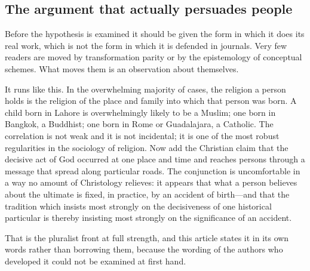 \subsection{The argument that actually persuades people}

Before the hypothesis is examined it should be given the form in which it does its real work, which is not the form in which it is defended in journals. Very few readers are moved by transformation parity or by the epistemology of conceptual schemes. What moves them is an observation about themselves.

It runs like this. In the overwhelming majority of cases, the religion a person holds is the religion of the place and family into which that person was born. A child born in Lahore is overwhelmingly likely to be a Muslim; one born in Bangkok, a Buddhist; one born in Rome or Guadalajara, a Catholic. The correlation is not weak and it is not incidental; it is one of the most robust regularities in the sociology of religion. Now add the Christian claim that the decisive act of God occurred at one place and time and reaches persons through a message that spread along particular roads. The conjunction is uncomfortable in a way no amount of Christology relieves: it appears that what a person believes about the ultimate is fixed, in practice, by an accident of birth---and that the tradition which insists most strongly on the decisiveness of one historical particular is thereby insisting most strongly on the significance of an accident.

That is the pluralist front at full strength, and this article states it in its own words rather than borrowing them, because the wording of the authors who developed it could not be examined at first hand.

